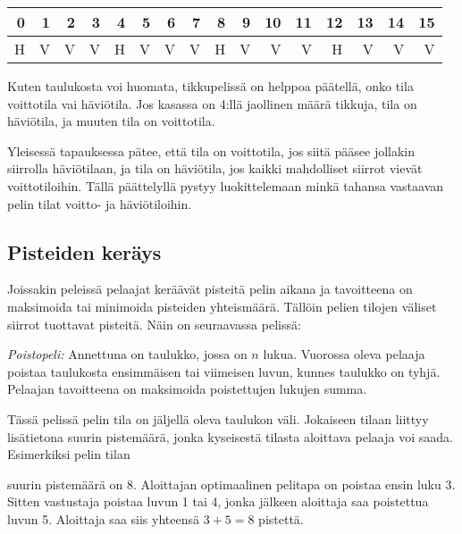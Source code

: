 \begin{center}
\begin{tabular}{rrrrrrrrrrrrrrrr}
0 & 1 & 2 & 3 & 4 & 5 & 6 & 7 & 8 & 9 & 10 & 11 & 12 & 13 & 14 & 15\\
\hline
H & V & V & V & H & V & V & V & H & V & V & V & H & V & V & V \\
\end{tabular}
\end{center}

Kuten taulukosta voi huomata,
tikkupelissä on helppoa päätellä,
onko tila voittotila vai häviötila.
Jos kasassa on 4:llä jaollinen määrä tikkuja,
tila on häviötila,
ja muuten tila on voittotila.

Yleisessä tapauksessa pätee, että tila on
voittotila, jos siitä pääsee jollakin siirrolla häviötilaan,
ja tila on häviötila,
jos kaikki mahdolliset siirrot vievät voittotiloihin.
Tällä päättelyllä pystyy luokittelemaan minkä tahansa vastaavan
pelin tilat voitto- ja häviötiloihin.

\subsection{Pisteiden keräys}

Joissakin peleissä pelaajat keräävät pisteitä
pelin aikana ja tavoitteena on maksimoida
tai minimoida pisteiden yhteismäärä.
Tällöin pelien tilojen väliset siirrot
tuottavat pisteitä.
Näin on seuraavassa pelissä:

\textit{Poistopeli:} Annettuna on taulukko,
jossa on $n$ lukua.
Vuorossa oleva pelaaja poistaa
taulukosta ensimmäisen tai viimeisen
luvun, kunnes taulukko on tyhjä.
Pelaajan tavoitteena on
maksimoida poistettujen lukujen summa.

Tässä pelissä pelin tila on jäljellä oleva
taulukon väli. Jokaiseen tilaan liittyy
lisätietona suurin
pistemäärä, jonka kyseisestä tilasta aloittava pelaaja
voi saada. Esimerkiksi pelin tilan
\begin{center}
\end{center}
suurin pistemäärä on 8.
Aloittajan optimaalinen pelitapa on poistaa ensin luku 3.
Sitten vastustaja poistaa luvun 1 tai 4,
jonka jälkeen aloittaja saa poistettua luvun 5.
Aloittaja saa siis yhteensä $3+5=8$ pistettä.

